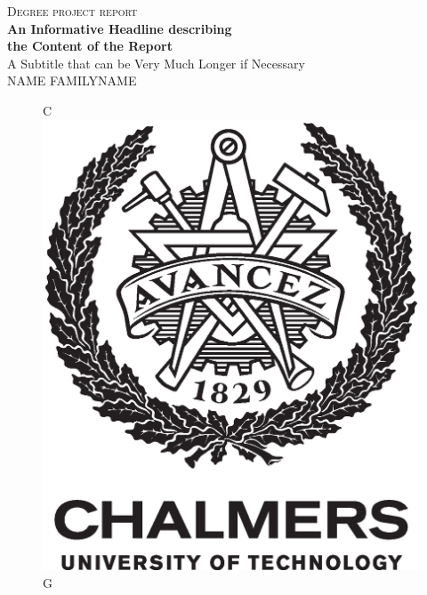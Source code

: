 \newpage
\restoregeometry
\thispagestyle{empty}
\mbox{}


\newpage
\thispagestyle{empty}
\begin{center}
    \textsc{\large Degree project report \the\year}\\[4cm]
    \textbf{\Large An Informative Headline describing\\ the Content of the Report} \\[1cm]
    {\large A Subtitle that can be Very Much Longer if Necessary}\\[1cm]
    {\large NAME FAMILYNAME}
    
    \vfill	
    \begin{figure}[H]
        \centering
        \if\InstitutionLocation C   %
        \includegraphics[width=0.2\pdfpagewidth]{figure/auxiliary/AvancezChalmersU_black_centered.eps} \\
        \fi
        \if\InstitutionLocation G

\end{figure}
\end{center}
